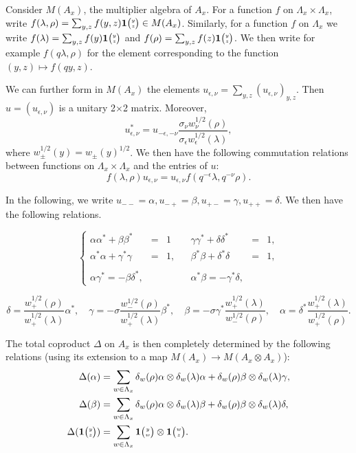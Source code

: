 Consider $M(A_x)$, the multiplier algebra of $A_x$. For a function $f$ on $\Lambda_x\times \Lambda_x$, write $f(\lambda,\rho) = \sum_{y,z} f(y,z)\mathbf{1}{\tiny {\begin{pmatrix} y\\z\end{pmatrix}}} \in M(A_x)$. Similarly, for a function $f$ on $\Lambda_x$ we write $f(\lambda) = \sum_{y,z} f(y)\mathbf{1}{\tiny {\begin{pmatrix} y\\z\end{pmatrix}}}$ and $f(\rho) = \sum_{y,z}f(z)\mathbf{1}{\tiny {\begin{pmatrix} y\\z\end{pmatrix}}}$. We then write for example $f(q\lambda,\rho)$ for the element corresponding to the function $(y,z)\mapsto f(qy,z)$.

We can further form in $M(A_x)$ the elements $u_{\epsilon,\nu} = \sum_{y,z} (u_{\epsilon,\nu})_{y,z}$. Then $u=(u_{\epsilon,\nu})$ is a unitary 2$\times$2 matrix. Moreover, \begin{equation}\label{EqAdju}u_{\epsilon,\nu}^* = u_{-\epsilon,-\nu}\frac{ \sigma_{\nu}w_{\nu}^{1/2}(\rho)}{\sigma_{\epsilon}w_{\epsilon}^{1/2}(\lambda)} ,\end{equation} where $w_{\pm}^{1/2}(y) = w_{\pm}(y)^{1/2}$.  We then have the following commutation relations between functions on $\Lambda_x\times \Lambda_x$ and the entries of $u$: \begin{equation}\label{EqGradu} f(\lambda,\rho)u_{\epsilon,\nu} = u_{\epsilon,\nu}f(q^{-\epsilon}\lambda,q^{-\nu}\rho).\end{equation}

In the following, we write $u_{--}=\alpha, u_{-+}= \beta, u_{+-}=\gamma,u_{++}=\delta$. We then have the following relations.

\[\left\{\begin{array}{lllllll} \alpha\alpha^* + \beta\beta^* &=& 1 &&  \gamma\gamma^* + \delta\delta^* &=& 1,\\ \alpha^*\alpha+ \gamma^*\gamma &=&1,&&\beta^*\beta+ \delta^*\delta &=& 1,\\ \\ \alpha \gamma^* = -\beta \delta^*, &&&& \alpha^*\beta = -\gamma^*\delta, \end{array}\right.\]

\[ \delta =  \frac{w_+^{1/2}(\rho)}{w_+^{1/2}(\lambda)}\alpha^*, \quad \gamma=  -\sigma \frac{w_{-}^{1/2}(\rho)}{w_+^{1/2}(\lambda)}\beta^*,\quad  \beta = -\sigma \gamma^*\frac{w_+^{1/2}(\lambda)}{w_{-}^{1/2}(\rho)}, \quad  \alpha = \delta^* \frac{w_+^{1/2}(\lambda)}{w_+^{1/2}(\rho)}.\]

The total coproduct $\Delta$ on $A_x$ is then completely determined by the following relations (using its extension to a map $M(A_x) \rightarrow M(A_x\otimes A_x)$): \begin{align*}\Delta(\alpha) &= \sum_{w\in \Lambda_x} \delta_w(\rho) \alpha \otimes \delta_w(\lambda)\alpha + \delta_w(\rho) \beta \otimes \delta_w(\lambda)\gamma,\\
 \Delta(\beta) &= \sum_{w\in \Lambda_x}\delta_w(\rho) \alpha \otimes \delta_w(\lambda)\beta + \delta_w(\rho) \beta \otimes \delta_w(\lambda)\delta,\\
  \Delta(\mathbf{1}{\tiny {\begin{pmatrix} y\\z\end{pmatrix}}}) &= \sum_{w\in \Lambda_x} \mathbf{1}{\tiny {\begin{pmatrix} y\\w\end{pmatrix}}}\otimes \mathbf{1}{\tiny {\begin{pmatrix} w\\z\end{pmatrix}}}. \end{align*} 

